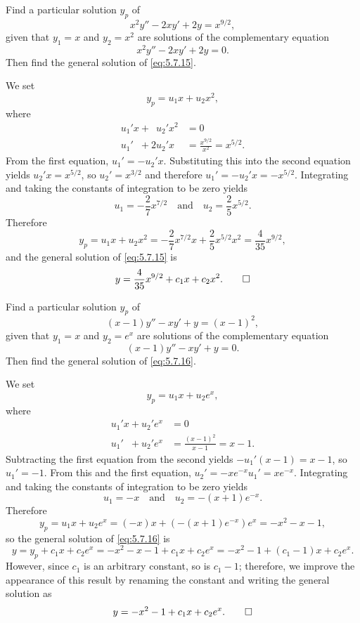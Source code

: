 \begin{example}\label{example:5.7.1}
 Find a particular
solution $y_p$ of
\begin{equation} \label{eq:5.7.15}
x^2y''-2xy'+2y=x^{9/2},
\end{equation}
given that $y_1=x$ and $y_2=x^2$ are solutions of the complementary
equation
\[
x^2y''-2xy'+2y=0.
\]
 Then find the general solution of \eqref{eq:5.7.15}.
\end{example}

\begin{solution}
We set
\[
y_p=u_1x+u_2x^2,
\]
where
\begin{align*}
u_1'x+\phantom{2}u_2'x^2&=0\\
u_1'\phantom{x}+2u_2'x\phantom{^2}&=\frac{x^{9/2}}{x^2}=x^{5/2}.
\end{align*}
From the first equation, $u_1'=-u_2'x$. Substituting this into the
second equation yields $u_2'x=x^{5/2}$, so $u_2'=x^{3/2}$ and
therefore $u_1'=-u_2'x=-x^{5/2}$. Integrating and taking the constants
of integration to be zero yields
\[
u_1=-\frac{2}{7}x^{7/2}\quad\text{and}\quad u_2=\frac{2}{5}x^{5/2}.
\]
Therefore
\[
y_p=u_1x+u_2x^2
=-\frac{2}{7}x^{7/2}x+\frac{2}{5}x^{5/2}x^2=\frac{4}{35}x^{9/2},
\]
and the general solution of  \eqref{eq:5.7.15} is
\[
y=\frac{4}{35}x^{9/2}+c_1x+c_2x^2.\qedhere
\]
\end{solution}

\begin{example}\label{example:5.7.2}
 Find a particular
solution $y_p$ of
\begin{equation} \label{eq:5.7.16}
(x-1)y''-xy'+y=(x-1)^2,
\end{equation}
given that $y_1=x$ and $y_2=e^x$ are solutions of the complementary
equation
\[
(x-1)y''-xy'+y=0.
\]
 Then find the general solution of \eqref{eq:5.7.16}.
\end{example}

\begin{solution}
We set
\[
y_p=u_1x+u_2e^x,
\]
where
\begin{align*}
u_1'x+u_2'e^x&=0\\
u_1'\phantom{x}+u_2'e^x&=\frac{(x-1)^2}{x-1}=x-1.
\end{align*}
Subtracting the first equation from the second yields
$-u_1'(x-1)=x-1$, so $u_1'=-1$. From this and the first equation,
$u_2'=-xe^{-x}u_1'=xe^{-x}$.
Integrating and taking the constants of integration to be zero yields
\[
u_1=-x  \quad\text{and}\quad  u_2=-(x+1)e^{-x}.
\]
Therefore
\[
y_p=u_1x+u_2e^x
=(-x)x+(-(x+1)e^{-x})e^x=-x^2-x-1,
\]
so the general solution of \eqref{eq:5.7.16} is
\begin{equation} \label{eq:5.7.17}
y=y_p+c_1x+c_2e^x=-x^2-x-1+c_1x+c_2e^x = -x^2-1+(c_1-1)x+c_2e^x.
\end{equation}
However, since $c_1$ is an arbitrary constant, so is $c_1-1$;
therefore, we  improve the appearance of this result by
renaming the constant and writing the general solution as
\begin{equation} \label{eq:5.7.18}
y= -x^2-1+c_1x+c_2e^x.\qedhere
\end{equation}
\end{solution}

